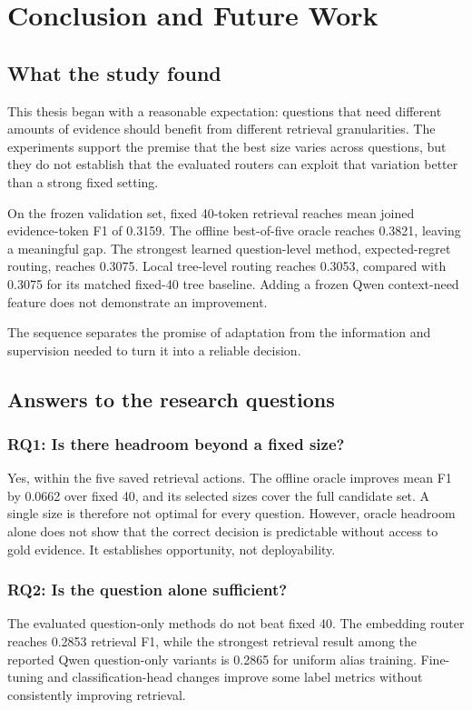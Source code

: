 \chapter{Conclusion and Future Work}
\label{ch:conclusion}

\section{What the study found}
This thesis began with a reasonable expectation: questions that need
different amounts of evidence should benefit from different retrieval
granularities. The experiments support the premise that the best size
varies across questions, but they do not establish that the evaluated
routers can exploit that variation better than a strong fixed setting.

On the frozen validation set, fixed 40-token retrieval reaches mean
joined evidence-token F1 of 0.3159. The offline best-of-five oracle
reaches 0.3821, leaving a meaningful gap. The strongest learned
question-level method, expected-regret routing, reaches 0.3075.
Local tree-level routing reaches 0.3053, compared with 0.3075 for
its matched fixed-40 tree baseline. Adding a frozen Qwen
context-need feature does not demonstrate an improvement.

The sequence separates the promise of adaptation from the information
and supervision needed to turn it into a reliable decision.

\section{Answers to the research questions}
\subsection{RQ1: Is there headroom beyond a fixed size?}
Yes, within the five saved retrieval actions. The offline oracle
improves mean F1 by 0.0662 over fixed 40, and its selected sizes
cover the full candidate set. A single size is therefore not
optimal for every question. However, oracle headroom alone does
not show that the correct decision is predictable without access
to gold evidence. It establishes opportunity, not deployability.

\subsection{RQ2: Is the question alone sufficient?}
The evaluated question-only methods do not beat fixed 40.
The embedding router reaches 0.2853 retrieval F1, while the
strongest retrieval result among the reported Qwen question-only
variants is 0.2865 for uniform alias training. Fine-tuning and
classification-head changes improve some label metrics without
consistently improving retrieval.

